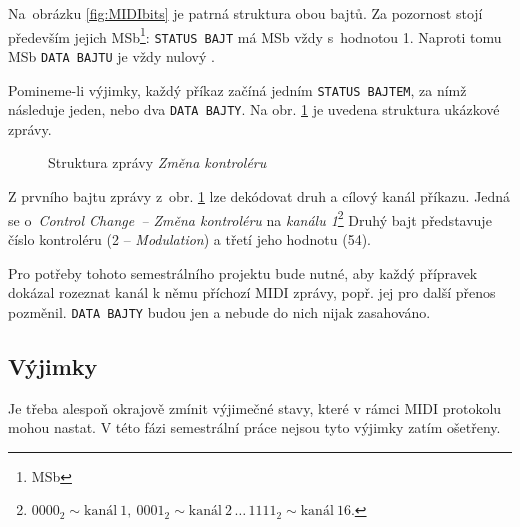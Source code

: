 Na~obrázku \ref{fig:MIDIbits} je patrná struktura obou bajtů. Za pozornost stojí především jejich \acs{MSb}\footnote{\acl{MSb}}: \texttt{STATUS~BAJT} má \acs{MSb} vždy s~hodnotou 1. Naproti tomu \acs{MSb} \texttt{DATA BAJTU} je vždy nulový  \cite{vkMIDI}.

Pomineme-li výjimky, každý příkaz začíná jedním \texttt{STATUS BAJTEM}, za nímž následuje jeden, nebo dva \texttt{DATA BAJTY}. Na obr. \ref{fig:MIDImsg} je uvedena struktura ukázkové zprávy.

\begin{figure}[h]
    \centering
    \caption{Struktura zprávy \emph{Změna kontroléru} \cite{MIDIspecs}}
    \label{fig:MIDImsg}
\end{figure}

Z prvního bajtu zprávy z~obr. \ref{fig:MIDImsg} lze dekódovat druh a cílový kanál příkazu. Jedná se o~\emph{Control Change~-- Změna kontroléru} na \emph{kanálu 1}\footnote{$0000_2 \sim \mathrm{kanál\ 1,\ } 0001_2 \sim \mathrm{kanál\ 2}\,\ldots\,1111_2\sim\mathrm{kanál\ 16}$.} Druhý bajt představuje číslo kontroléru (2 -- \emph{Modulation}) a třetí jeho hodnotu (54).

Pro potřeby tohoto semestrálního projektu bude nutné, aby každý přípravek dokázal rozeznat kanál k němu příchozí \acs{MIDI} zprávy, popř. jej pro další přenos pozměnil. \texttt{DATA~BAJTY} budou jen  a nebude do nich nijak zasahováno.

\subsection{Výjimky}\label{chpt:MIDIexcs}
Je třeba alespoň okrajově zmínit výjimečné stavy, které v rámci \acs{MIDI} protokolu mohou nastat. V této fázi semestrální práce nejsou tyto výjimky zatím ošetřeny.

